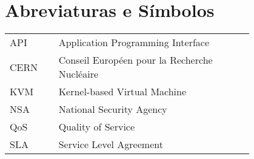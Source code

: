 \chapter*{Abreviaturas e Símbolos}

\begin{flushleft}
\begin{tabular}{l p{0.8\linewidth}}
API      & Application Programming Interface\\
CERN & Conseil Européen pour la Recherche Nucléaire\\
KVM & Kernel-based Virtual Machine\\
NSA & National Security Agency\\
QoS & Quality of Service\\
SLA & Service Level Agreement\\
\end{tabular}
\end{flushleft}

